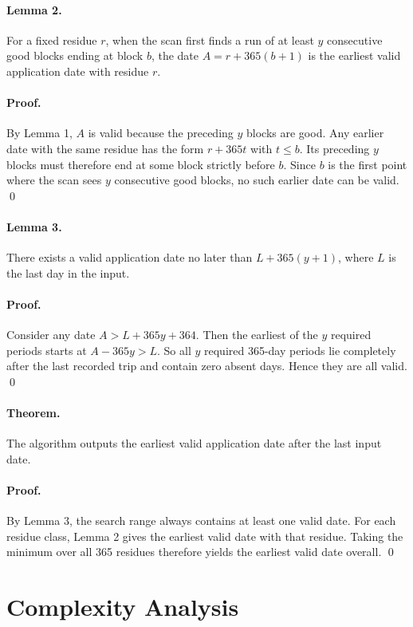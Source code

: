 \documentclass[11pt]{article}
\begin{document}
\paragraph{Lemma 2.}
For a fixed residue $r$, when the scan first finds a run of at least $y$ consecutive good blocks ending at
block $b$, the date $A = r + 365(b+1)$ is the earliest valid application date with residue $r$.

\paragraph{Proof.}
By Lemma 1, $A$ is valid because the preceding $y$ blocks are good. Any earlier date with the same
residue has the form $r + 365t$ with $t \le b$. Its preceding $y$ blocks must therefore end at some block
strictly before $b$. Since $b$ is the first point where the scan sees $y$ consecutive good blocks, no such
earlier date can be valid. \qed

\paragraph{Lemma 3.}
There exists a valid application date no later than $L + 365(y+1)$, where $L$ is the last day in the input.

\paragraph{Proof.}
Consider any date $A > L + 365y + 364$. Then the earliest of the $y$ required periods starts at
$A - 365y > L$. So all $y$ required 365-day periods lie completely after the last recorded trip and contain
zero absent days. Hence they are all valid. \qed

\paragraph{Theorem.}
The algorithm outputs the earliest valid application date after the last input date.

\paragraph{Proof.}
By Lemma 3, the search range always contains at least one valid date. For each residue class, Lemma 2
gives the earliest valid date with that residue. Taking the minimum over all 365 residues therefore yields
the earliest valid date overall. \qed

\section*{Complexity Analysis}
\end{document}

